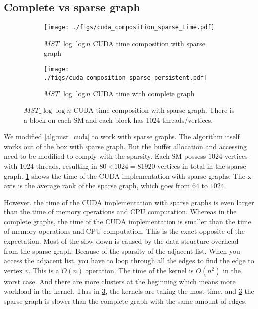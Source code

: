 \documentclass[english, 12pt, a4paper, elec, utf8, a-2b, online]{aaltothesis}
\newcommand{\mstalgo}{$MST\_\log\log{n}$}
\begin{document}

\subsection{Complete vs sparse graph}

\begin{figure}[h]
	\begin{subfigure}[b]{0.45\textwidth}
		\centering
		\texttt{[image: ./figs/cuda\_composition\_sparse\_time.pdf]}
		\caption{\mstalgo{} CUDA time composition with sparse graph}
		\label{fig:cuda_composition_sparse_time.pdf}
	\end{subfigure}
	\begin{subfigure}[b]{0.45\textwidth}
		\centering
		\texttt{[image: ./figs/cuda\_composition\_sparse\_persistent.pdf]}
		\caption{\mstalgo{} CUDA time with complete graph}
		\label{fig:cuda_composition_sparse_persistent.pdf}
	\end{subfigure}
	\caption{\mstalgo{} CUDA time composition with sparse graph. There is a block on each SM and each block has 1024 threads/vertices.}
	\label{fig:cuda_composition_sparse}
\end{figure}

We modified \cref{alg:mst_cuda} to work with sparse graphs. The algorithm itself works out of the box with sparse graph. But the buffer allocation and accessing need to be modified to comply with the sparsity. Each SM possess $1024$ vertices with $1024$ threads, resulting in $80 \times 1024 = 81920$ vertices in total in the sparse graph. \cref{fig:cuda_composition_sparse_time.pdf} shows the time of the CUDA implementation with sparse graphs. The x-axis is the average rank of the sparse graph, which goes from $64$ to $1024$.

However, the time of the CUDA implementation with sparse graphs is even larger than the time of memory operations and CPU computation. Whereas in the complete graphs, the time of the CUDA implementation is smaller than the time of memory operations and CPU computation. This is the exact opposite of the expectation. Most of the slow down is caused by the data structure overhead from the sparse graph. Because of the sparsity of the adjacent list. When you access the adjacent list, you have to loop through all the edges to find the edge to vertex $v$. This is a $O(n)$ operation. The time of the kernel is $O(n^2)$ in the worst case.  And there are more clusters at the beginning which means more workload in the kernel. Thus in \cref{fig:cuda_composition_sparse}, the kernels are taking the most time, and \cref{fig:cuda_composition_sparse} the sparse graph is slower than the complete graph with the same amount of edges.
\end{document}
